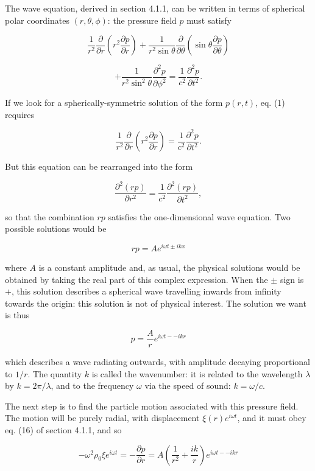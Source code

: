  The wave equation, derived in section 4.1.1, can be written in terms of 
  spherical polar coordinates $(r,\theta,\phi)$: the pressure field $p$ must 
  satisfy 

  $$\frac{1}{r^2} \frac{\partial}{\partial r} \left( r^2 \frac{\partial 
  p}{\partial r} \right) + \frac{1}{r^2 \sin \theta} \frac{\partial}{\partial 
  \theta} \left(\sin \theta \frac{\partial p}{\partial \theta} \right) $$ 

  $$+ \frac{1}{r^2 \sin^2 \theta} \frac{\partial^2 p}{\partial \phi^2} = 
  \frac{1}{c^2} \frac{\partial^2 p}{\partial t^2}. \tag{1}$$ 

  If we look for a spherically-symmetric solution of the form $p(r,t)$, eq. (1) 
  requires 

  $$\frac{1}{r^2} \frac{\partial}{\partial r} \left( r^2 \frac{\partial 
  p}{\partial r} \right) = \frac{1}{c^2} \frac{\partial^2 p}{\partial t^2}. 
  \tag{2}$$ 

  But this equation can be rearranged into the form 

  $$ \frac{\partial^2 (rp)}{\partial r^2} = \frac{1}{c^2} \frac{\partial^2 
  (rp)}{\partial t^2}, \tag{3}$$ 

  so that the combination $rp$ satisfies the one-dimensional wave equation. Two 
  possible solutions would be 

  $$rp=Ae^{i \omega t \pm i k x} \tag{4}$$ 

  where $A$ is a constant amplitude and, as usual, the physical solutions would 
  be obtained by taking the real part of this complex expression. When the 
  $\pm$ sign is $+$, this solution describes a spherical wave travelling 
  inwards from infinity towards the origin: this solution is not of physical 
  interest. The solution we want is thus 

  $$p=\frac{A}{r} e^{i \omega t -- i k r} \tag{5}$$ 

  which describes a wave radiating outwards, with amplitude decaying 
  proportional to $1/r$. The quantity $k$ is called the wavenumber: it is 
  related to the wavelength $\lambda$ by $k=2 \pi /\lambda$, and to the 
  frequency $\omega$ via the speed of sound: $k=\omega /c$. 

  The next step is to find the particle motion associated with this pressure 
  field. The motion will be purely radial, with displacement $\xi(r) e^{i 
  \omega t}$, and it must obey eq. (16) of section 4.1.1, and so 

  $$- \omega^2 \rho_0 \xi e^{i \omega t} = -\frac{\partial p}{\partial r} = 
  A\left( \frac{1}{r^2} + \frac{ik}{r}\right) e^{i\omega t -- ikr} \tag{6}$$ 

